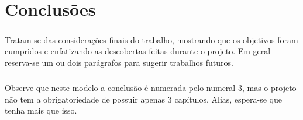 \chapter{Conclusões}
\label{cap3}

\paragraph{}Tratam-se das considerações finais do trabalho, mostrando que os objetivos foram cumpridos e enfatizando as descobertas feitas durante o projeto. Em geral reserva-se um ou dois parágrafos para sugerir trabalhos futuros.

\paragraph{}Observe que neste modelo a conclusão é numerada pelo numeral 3, mas o projeto não tem a obrigatoriedade de possuir apenas 3 capítulos. Alias, espera-se que tenha mais que isso.

